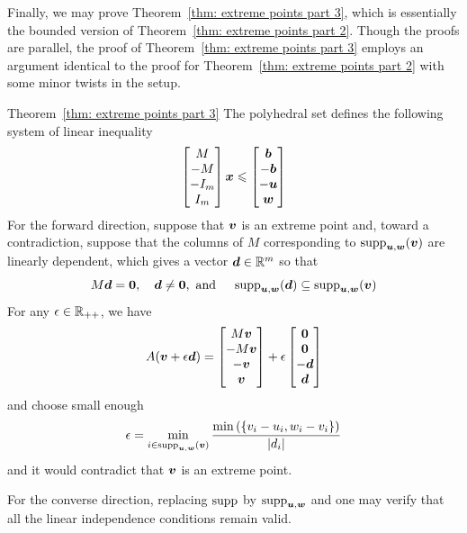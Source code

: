 Finally, we may prove Theorem~\ref{thm: extreme points part 3}, which is essentially the bounded version of Theorem~\ref{thm: extreme points part 2}. Though the proofs are parallel, the proof of Theorem~\ref{thm: extreme points part 3} employs an argument identical to the proof for Theorem~\ref{thm: extreme points part 2} with some minor twists in the setup.

\begin{proofof}{Theorem~\ref{thm: extreme points part 3}}
The polyhedral set defines the following system of linear inequality
\[ \begin{bmatrix} M \\ -M \\ -I_m \\ I_m  \end{bmatrix}{\boldsymbol x} \leqslant \begin{bmatrix}  {\boldsymbol b} \\ -{\boldsymbol b} \\ -{\boldsymbol u} \\ {\boldsymbol w}  \end{bmatrix}  \]
For the forward direction, suppose that ${\boldsymbol v}$ is an extreme point and, toward a contradiction, suppose that the columns of $M$ corresponding to $\operatorname{supp}_{{\boldsymbol u}, {\boldsymbol w}}({\boldsymbol v})$ are linearly dependent, which gives a vector ${\boldsymbol d}\in\mathbb R^m$ so that 
\[ M{\boldsymbol d} = \boldsymbol0, \quad {\boldsymbol d}\neq\boldsymbol0, \text{ and }\quad \operatorname{supp}_{{\boldsymbol u}, {\boldsymbol w}}({\boldsymbol d})\subseteq \operatorname{supp}_{{\boldsymbol u}, {\boldsymbol w}}({\boldsymbol v}) \] 
For any $\epsilon\in\mathbb R_{++}$, we have 
\[A({\boldsymbol v} + \epsilon {\boldsymbol d}) = \begin{bmatrix} M {\boldsymbol v} \\ -M {\boldsymbol v}  \\  -{\boldsymbol v} \\ {\boldsymbol v} \end{bmatrix} + \epsilon \begin{bmatrix} \boldsymbol0 \\ \boldsymbol0  \\  -{\boldsymbol d} \\ {\boldsymbol d} \end{bmatrix} \]
and choose small enough 
\[\epsilon = \min_{i\in \operatorname{supp}_{{\boldsymbol u}, {\boldsymbol w}}({\boldsymbol v})} \frac{\min\left(\{ v_i - u_i, w_i -v_i \} \right) }{|d_i|} \] and it would contradict that ${\boldsymbol v}$ is an extreme point. 

For the converse direction, replacing $\operatorname{supp}$ by $\operatorname{supp}_{{\boldsymbol u}, {\boldsymbol w}}$ and one may verify that all the linear independence conditions remain valid. 
\end{proofof}


